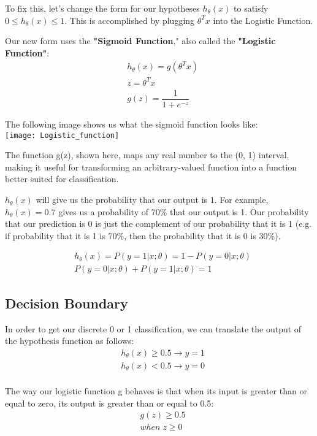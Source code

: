 \documentclass{article}
\begin{document}
To fix this, let’s change the form for our hypotheses $h_\theta (x)$ to satisfy $0 \leq h_\theta (x) \leq 1$. This is accomplished by plugging $\theta^Tx$ into the Logistic Function.

Our new form uses the \textbf{"Sigmoid Function}," also called the \textbf{"Logistic Function"}:
\begin{align*}
	& h_\theta (x) = g ( \theta^T x ) \\ 
	& z = \theta^T x \\
	& g(z) = \dfrac{1}{1 + e^{-z}}
\end{align*}

The following image shows us what the sigmoid function looks like:\\
\texttt{[image: Logistic\_function]}

The function g(z), shown here, maps any real number to the (0, 1) interval, making it useful for transforming an arbitrary-valued function into a function better suited for classification.

$h_\theta(x)$ will give us the probability that our output is 1. For example, $h_\theta(x)=0.7$ gives us a probability of 70\% that our output is 1. Our probability that our prediction is 0 is just the complement of our probability that it is 1 (e.g. if probability that it is 1 is 70\%, then the probability that it is 0 is 30\%).

\begin{align*}
	& h_\theta(x) = P(y=1 | x ; \theta) = 1 - P(y=0 | x ; \theta) \\
	& P(y = 0 | x;\theta) + P(y = 1 | x ; \theta) = 1
\end{align*}

\subsection{Decision Boundary}
In order to get our discrete 0 or 1 classification, we can translate the output of the hypothesis function as follows:
\begin{align*}
	&h_\theta(x) \geq 0.5 \rightarrow y = 1 \\
	&h_\theta(x) < 0.5 \rightarrow y = 0 \\
\end{align*}

The way our logistic function g behaves is that when its input is greater than or equal to zero, its output is greater than or equal to 0.5:
\begin{align*}
	& g(z) \geq 0.5 \\
	& when \; z \geq 0
\end{align*}
\end{document}
